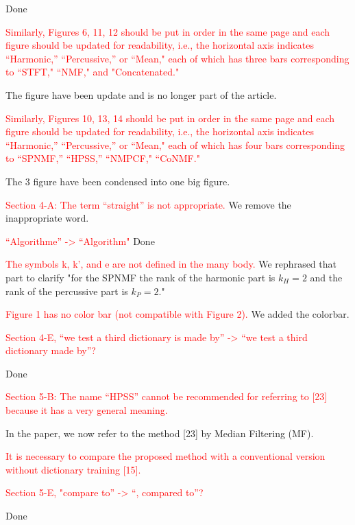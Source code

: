 \documentclass[]{article}
\begin{document}
Done

\textcolor{red}{Similarly, Figures 6, 11, 12 should be put in order in the same page and each figure should be updated for readability, i.e., the horizontal axis indicates “Harmonic,” “Percussive,” or “Mean," each of which has three bars corresponding to “STFT," “NMF," and "Concatenated."
}

The figure have been update and is no longer part of the article. 

\textcolor{red}{Similarly, Figures 10, 13, 14 should be put in order in the same page and each figure should be updated for readability, i.e., the horizontal axis indicates “Harmonic,” “Percussive,” or “Mean," each of which has four bars corresponding to “SPNMF,” “HPSS,” “NMPCF," “CoNMF."
}

The 3 figure have been condensed into one big figure. 

\textcolor{red}{Section 4-A:
The term “straight” is not appropriate.
}
We remove the inappropriate word.

\textcolor{red}{“Algorithme” -> “Algorithm"
}
Done

\textcolor{red}{The symbols k, k’, and e are not defined in the many body.
}
We rephrased that part to clarify "for the SPNMF the rank of the harmonic part is $k_H=2$ and the rank of the percussive part is $k_P=2$."

\textcolor{red}{Figure 1 has no color bar (not compatible with Figure 2).
}
We added the colorbar.

\textcolor{red}{Section 4-E,
“we test a third dictionary is made by” -> “we test a third dictionary made by”?}

Done

\textcolor{red}{Section 5-B:
The name “HPSS” cannot be recommended for referring to [23] because it has a very general meaning.}

In the paper, we now refer to the method [23] by Median Filtering (MF).

\textcolor{red}{It is necessary to compare the proposed method with a conventional version without dictionary training [15].
}


\textcolor{red}{Section 5-E,
"compare to” -> “, compared to”?}

Done



%
\end{document}
